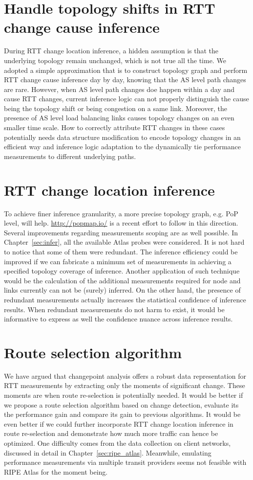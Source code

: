 \section{Handle topology shifts in RTT change cause inference} 
During RTT change location inference, a hidden assumption is that the underlying topology remain unchanged, which is not true all the time. We adopted a simple approximation that is to construct topology graph and perform RTT change cause inference day by day, knowing that the AS level path changes are rare. 
However, when AS level path changes doe happen within a day and cause RTT changes, current inference logic can not properly distinguish the cause being the topology shift or being congestion on a same link.
Moreover, the presence of AS level load balancing links causes topology changes on an even smaller time scale. 
How to correctly attribute RTT changes in these cases potentially needs data structure modification to encode topology changes in an efficient way and inference logic adaptation to the dynamically tie performance measurements to different underlying paths.

\section{RTT change location inference}
To achieve finer inference granularity, a more precise topology graph, e.g. \ac{PoP} level, will help. \url{http://popmap.io/} is a recent effort to follow in this direction.
Several improvements regarding measurements scoping are as well possible. In Chapter~\ref{sec:infer}, all the available Atlas probes were considered. It is not hard to notice that some of them were redundant.
The inference efficiency could be improved if we can fabricate a minimum set of measurements in achieving a specified topology coverage of inference.
Another application of such technique would be the calculation of the additional measurements required for node and links currently can not be (surely) inferred.
On the other hand, the presence of redundant measurements actually increases the statistical confidence of inference results. When redundant measurements do not harm to exist, it would be informative to express as well the confidence nuance across inference results.

\section{Route selection algorithm}
We have argued that changepoint analysis offers a robust data representation for RTT measurements by extracting only the moments of significant change. These moments are when route re-selection is potentially needed. It would be better if we propose a route selection algorithm based on change detection, evaluate its the performance gain and compare its gain to previous algorithms.
It would be even better if we could further incorporate RTT change location inference in route re-selection and demonstrate how much more traffic can hence be optimized.
One difficulty comes from the data collection on client networks, discussed in detail in Chapter~\ref{sec:ripe_atlas}. Meanwhile, emulating performance measurements via multiple transit providers seems not feasible with RIPE Atlas for the moment being.
 